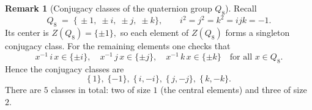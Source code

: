 \documentclass[12pt]{article}
\theoremstyle{definition} %
\newtheorem{remark}{Remark}
\theoremstyle{plain} %
\begin{document}
      \begin{remark}[Conjugacy classes of the quaternion group \(Q_{8}\)]
        Recall
        \[
           Q_{8}
              \;=\;
              \bigl\{\,\pm1,\;\pm i,\;\pm j,\;\pm k\bigr\},
              \qquad
              i^{2}=j^{2}=k^{2}=ijk=-1.
        \]
        Its center is
        \(
           Z(Q_{8})=\{\pm1\},
        \)
        so each element of \(Z(Q_{8})\) forms a singleton conjugacy class.
        For the remaining elements one checks that
        \[
           x^{-1}\,i\,x
              \in\{\pm i\},
           \quad
           x^{-1}\,j\,x
              \in\{\pm j\},
           \quad
           x^{-1}\,k\,x
              \in\{\pm k\}
           \quad
           \text{for all }x\in Q_{8}.
        \]
        Hence the conjugacy classes are
        \[
           \boxed{
           \{\,1\},
           \;\{-1\},
           \;\{\,i,-i\},
           \;\{\,j,-j\},
           \;\{\,k,-k\}.
           }
        \]
        There are \(5\) classes in total:
        two of size \(1\) (the central elements) and three of size \(2\).
        \end{remark}
\end{document}

